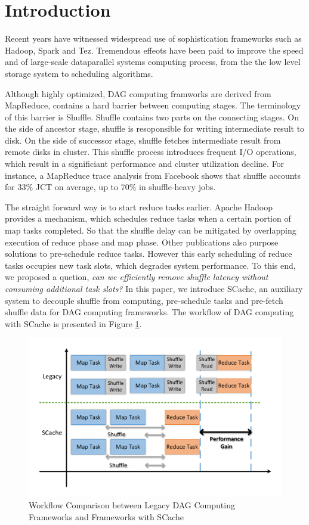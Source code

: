 \section{Introduction}

Recent years have witnessed widespread use of sophistication frameworks such as Hadoop\cite{hadoop}, Spark\cite{spark} and Tez\cite{spark}.
Tremendous effeots have been paid to improve the speed and of large-scale dataparallel systems computing process, from the the low level storage system to scheduling algorithms.

Although highly optimized, DAG computing framworks are derived from MapReduce\cite{mapreduce}, contains a hard barrier between computing stages. The terminology of this barrier is Shuffle. Shuffle contains two parts on the connecting stages. On the side of ancestor stage, shuffle is resoponsible for writing intermediate result to disk. On the side of successor stage, shuffle fetches intermediate result from remote disks in cluster. This shuffle process introduces frequent I/O operations, which result in a significiant performance and cluster utilization decline. For instance, a MapReduce trace analysis from Facebook shows that shuffle accounts for 33\% JCT on average, up to 70\% in shuffle-heavy jobs\cite{manage}.

The straight forward way is to start reduce tasks earlier. Apache Hadoop\cite{hadoop} provides a mechanism, which schedules reduce tasks when a certain portion of map tasks completed. So that the shuffle delay can be mitigated by overlapping execution of reduce phase and map phase. Other publications also purpose solutions to pre-schedule reduce tasks\cite{ihadoop, ishuffle, dynmr}. However this early scheduling of reduce tasks occupies new task slots, which degrades system performance. To this end, we proposed a quetion, \textit{can we efficiently remove shuffle latency without consuming additional task slots?} 
In this paper, we introduce SCache, an auxiliary system to decouple shuffle from computing, pre-schedule tasks and pre-fetch shuffle data for DAG computing frameworks. The workflow of DAG computing with SCache is presented in Figure \ref{fig:workflow}.

\begin{figure}
	\centering
	\includegraphics[width=\linewidth]{fig/workflow}
	\caption{Workflow Comparison between Legacy DAG Computing Frameworks and Frameworks with SCache}
	\label{fig:workflow}
\end{figure}
